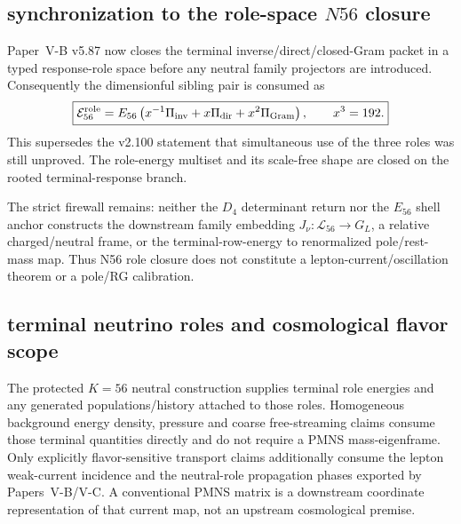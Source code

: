 \documentclass[12pt,a4paper]{article}
\begin{document}
\subsection{synchronization to the role-space \texorpdfstring{$N56$}{N56} closure}
\label{p8:sec:v2130-n56-role-energy-sync}

Paper~V-B v5.87 now closes the terminal inverse/direct/closed-Gram packet in a
typed response-role space before any neutral family projectors are introduced.
Consequently the dimensionful sibling pair is consumed as
\[
 \boxed{
 \mathcal E_{56}^{\rm role}
 =E_{56}\left(
 x^{-1}\Pi_{\rm inv}+x\Pi_{\rm dir}+x^2\Pi_{\rm Gram}
 \right),\qquad x^3=192.}
\]
This supersedes the v2.100 statement that simultaneous use of the three roles
was still unproved.  The role-energy multiset and its scale-free shape are
closed on the rooted terminal-response branch.

The strict firewall remains: neither the $D_4$ determinant return nor the
$E_{56}$ shell anchor constructs the downstream family embedding
$J_\nu:\mathscr L_{56}\to G_L$, a relative charged/neutral frame, or the
terminal-row-energy to renormalized pole/rest-mass map.  Thus N56 role closure
does not constitute a lepton-current/oscillation theorem or a pole/RG calibration.


\subsection{terminal neutrino roles and cosmological flavor scope}
\label{p8:sec:v2133-lepton-flavor-cosmo-sync}

The protected $K=56$ neutral construction supplies terminal role energies and
any generated populations/history attached to those roles.  Homogeneous
background energy density, pressure and coarse free-streaming claims consume
those terminal quantities directly and do not require a PMNS mass-eigenframe.
Only explicitly flavor-sensitive transport claims additionally consume the
lepton weak-current incidence and the neutral-role propagation phases exported
by Papers~V-B/V-C.  A conventional PMNS matrix is a downstream coordinate
representation of that current map, not an upstream cosmological premise.




\end{document}
